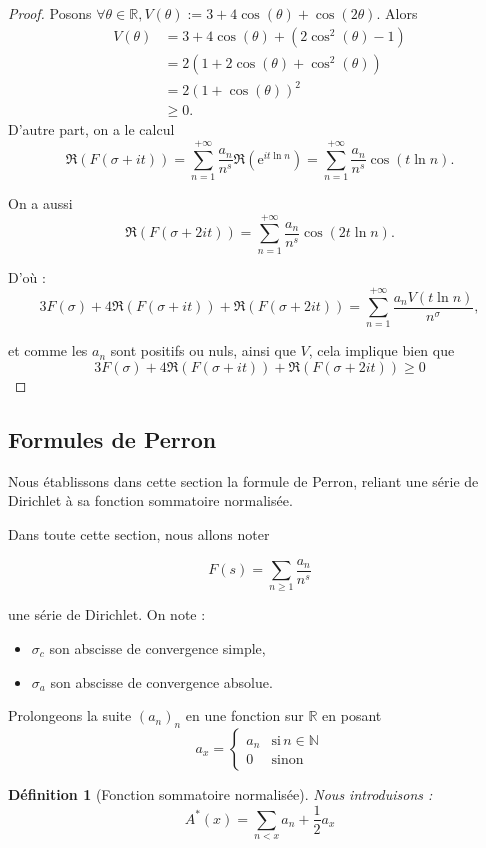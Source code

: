 \documentclass[french]{report}
\newtheorem{definition}[theorem]{Définition}
\begin{document}
\begin{proof}
  Posons $\forall\theta\in\mathbb{R}, V(\theta) := 3+4\cos(\theta)+\cos(2\theta)$. Alors
  \begin{align*}
    V(\theta) &= 3+4\cos(\theta)+(2\cos^2(\theta)-1) \\
              &= 2(1+2\cos(\theta)+\cos^2(\theta)) \\
              &= 2(1+\cos(\theta))^2 \\
              &\geq0.
  \end{align*}
  D'autre part, on a le calcul
  \[
    \Re(F(\sigma+it))
    =\sum_{n=1}^{+\infty}\frac{a_n}{n^s}\Re(\mathrm{e}^{it\ln n})
    =\sum_{n=1}^{+\infty}\frac{a_n}{n^s}\cos(t\ln n).
  \]

  On a aussi
  \[
    \Re(F(\sigma+2it))
    = \sum_{n=1}^{+\infty}\frac{a_n}{n^s}\cos(2t\ln n).
  \]

  D'où :
  \[
    3F(\sigma)+4\Re(F(\sigma+it))+\Re(F(\sigma+2it))
    = \sum_{n=1}^{+\infty}\frac{a_n V(t\ln n)}{n^\sigma},
  \]

  et comme les $a_n$ sont positifs ou nuls, ainsi que $V$, cela implique bien que
  \[ 3F(\sigma)+4\Re(F(\sigma+it))+\Re(F(\sigma+2it))\geq0 \]
  
\end{proof}

\subsection{Formules de Perron}

Nous établissons dans cette section la formule de Perron, reliant une série de Dirichlet à sa fonction sommatoire normalisée.

Dans toute cette section, nous allons noter

\[ F(s) =\sum_{n\geq1}\frac{a_n}{n^s}\]

une série de Dirichlet. On note :
\begin{itemize}
  \item $\sigma_c$ son abscisse de convergence simple,
  \item $\sigma_a$ son abscisse de convergence absolue.
\end{itemize}

Prolongeons la suite $(a_n)_n$ en une fonction sur $\mathbb{R}$ en posant
\[
  a_x=
  \begin{cases}
    a_n & \text{si}\,n\in\mathbb{N} \\
    0  & \text{sinon}
  \end{cases}
\]
\begin{definition}[Fonction sommatoire normalisée]
  Nous introduisons :
  \[ A^*(x) = \sum_{n<x}a_n + \frac{1}{2}a_x \]
\end{definition}
\end{document}
